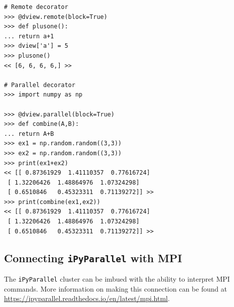 \begin{lstlisting}
# Remote decorator
>>> @dview.remote(block=True)
>>> def plusone():
...	return a+1
>>> dview['a'] = 5
>>> plusone()
<< [6, 6, 6, 6,] >>

# Parallel decorator
>>> import numpy as np

>>> @dview.parallel(block=True)
>>> def combine(A,B):
...	return A+B
>>> ex1 = np.random.random((3,3))
>>> ex2 = np.random.random((3,3))
>>> print(ex1+ex2)
<< [[ 0.87361929  1.41110357  0.77616724]
 [ 1.32206426  1.48864976  1.07324298]
 [ 0.6510846   0.45323311  0.71139272]] >>
>>> print(combine(ex1,ex2))
<< [[ 0.87361929  1.41110357  0.77616724]
 [ 1.32206426  1.48864976  1.07324298]
 [ 0.6510846   0.45323311  0.71139272]] >>
 \end{lstlisting}

\subsection*{Connecting \texttt{iPyParallel} with MPI}
The \texttt{iPyParallel} cluster can be imbued with the ability to interpret MPI commands.
More information on making this connection can be found at \url{https://ipyparallel.readthedocs.io/en/latest/mpi.html}.



